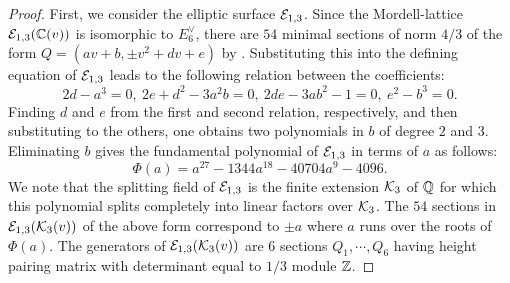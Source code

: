 \documentclass[11pt]{amsart}
\begin{document}
\begin{proof}
	First, we consider  the elliptic surface ${\mathcal E}_{1,3}$.
	Since the Mordell-lattice ${\mathcal E}_{1,3}({\mathbb C}(v))$ is isomorphic to  $E_6^\vee$, 
	there are $54$ minimal sections of norm $4/3$ of the  form
	$Q=(a v+b , \pm v^2+ d v +e)$ by   \cite[Theorem 10.5]{Shioda1991d}. 
	Substituting this into the defining equation of ${\mathcal E}_{1,3}$ leads to the following relation between the coefficients:
	\begin{equation}
		\label{rel4}
		2 d-a^3 =0, \  2 e+ d^2 -3 a^2 b = 0, \
		2 d e - 3 a b^2 -1  =0, \  e^2-b^3 =0.
	\end{equation}
	Finding $d$ and $e$ from the first and second relation, respectively,  and then substituting to the others, 
	one obtains two polynomials in $b$ of degree $2$ and $3$. Eliminating  $b$ gives the fundamental polynomial of  ${\mathcal E}_{1,3}$ in terms of $a$ as follows:
	\begin{equation}
		\Phi(a)= a^{27} - 1344 a^{18} - 40704 a^9 - 4096.
	\end{equation}
	We note that the splitting field  of ${\mathcal E}_{1,3}$  is the finite extension ${\mathcal K}_3$ of ${\mathbb Q}$ for which  this polynomial  splits completely into linear factors over ${\mathcal K}_3$. The  $54$ sections in ${\mathcal E}_{1,3}({\mathcal K}_3(v))$ of the above form correspond to $\pm a$ where $a$ runs over  the roots of $\Phi(a)$.  The generators of ${\mathcal E}_{1,3}({\mathcal K}_3(v))$ are $6$ sections  $Q_1,\cdots, Q_6$ having height pairing matrix with determinant
	equal to $1/3$ module ${\mathbb Z}$.
	

\end{proof}
\end{document}
